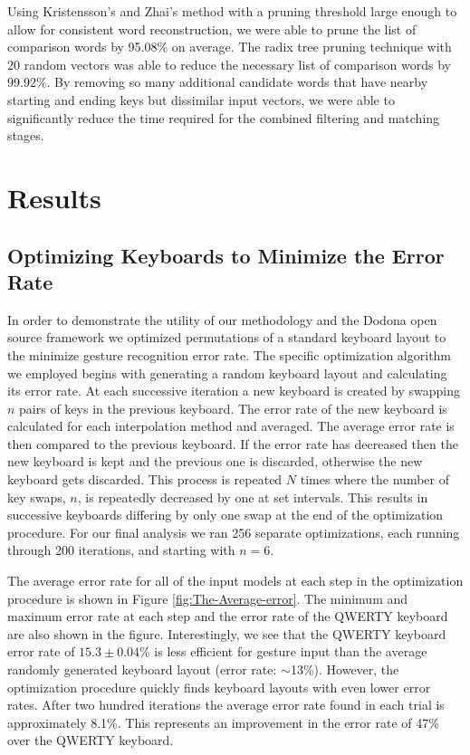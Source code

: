 \documentclass[final,1p,times,authoryear]{elsarticle}
\begin{document}
Using Kristensson's and Zhai's method with a pruning threshold large enough to allow for consistent word reconstruction, we were able to prune the list of comparison words by 95.08\% on average.
The radix tree pruning technique with 20 random vectors was able to reduce the necessary list of comparison words by 99.92\%.
By removing so many additional candidate words that have nearby starting and ending keys but dissimilar input vectors, we were able to significantly reduce the time required for the combined filtering and matching stages.


\section{\textbf{Results}}\label{sec:Results}


\subsection{Optimizing Keyboards to Minimize the Error Rate \label{sub:Keyboard-Optimization}}
In order to demonstrate the utility of our methodology and the Dodona open source framework we optimized permutations of a standard keyboard layout to the minimize gesture recognition error rate.
The specific optimization algorithm we employed begins with generating
a random keyboard layout and calculating its error rate. At each
successive iteration a new keyboard is created by swapping $n$ pairs
of keys in the previous keyboard. The error rate of the new keyboard
is calculated for each interpolation method and averaged. The average
error rate is then compared to the previous keyboard. If the error
rate has decreased then the new keyboard is kept and the previous
one is discarded, otherwise the new keyboard gets discarded. This
process is repeated $N$ times where the number of key swaps, $n$,
is repeatedly decreased by one at set intervals. This results in successive
keyboards differing by only one swap at the end of the optimization
procedure. For our final analysis we ran 256 separate optimizations,
each running through 200 iterations, and starting with $n=6$. 

The average error rate for all of the input models at each step in the optimization
procedure is shown in Figure \ref{fig:The-Average-error}. The minimum
and maximum error rate at each step and the error rate of the QWERTY
keyboard are also shown in the figure. Interestingly, we see that
the QWERTY keyboard error rate of $15.3 \pm 0.04$\% is less efficient for gesture
input than the average randomly generated keyboard layout (error rate:
$\sim$13\%). However, the optimization procedure quickly finds keyboard 
layouts with even lower error rates. After two hundred iterations the average error 
rate found in each trial is approximately 8.1\%. This represents an improvement in the
error rate of 47\% over the QWERTY keyboard. 
\end{document}
